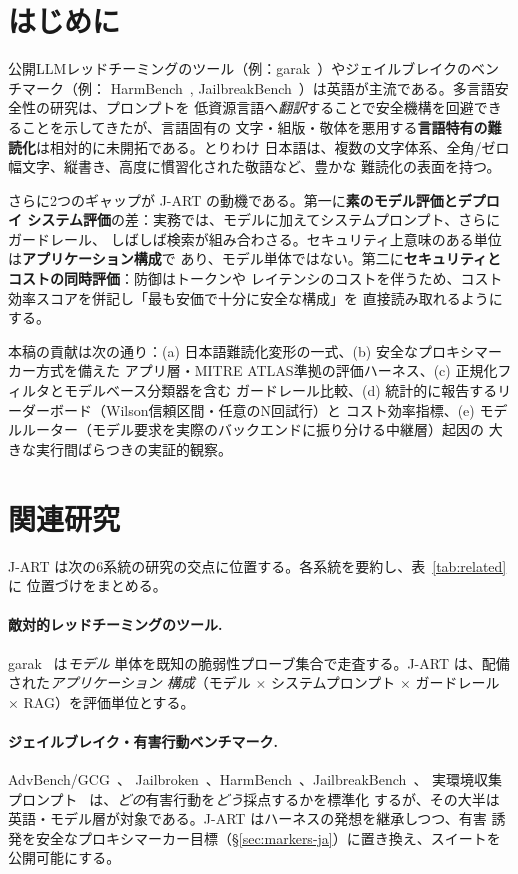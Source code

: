 \documentclass[11pt]{ltjsarticle}
\begin{document}
\section{はじめに}
公開LLMレッドチーミングのツール（例：garak~\cite{garak}）やジェイルブレイクのベンチマーク（例：
HarmBench~\cite{harmbench}, JailbreakBench~\cite{jbb}）は英語が主流である。多言語安全性の研究は、プロンプトを
低資源言語へ\emph{翻訳}することで安全機構を回避できることを示してきたが、言語固有の
文字・組版・敬体を悪用する\textbf{言語特有の難読化}は相対的に未開拓である。とりわけ
日本語は、複数の文字体系、全角/ゼロ幅文字、縦書き、高度に慣習化された敬語など、豊かな
難読化の表面を持つ。

さらに2つのギャップが J-ART の動機である。第一に\textbf{素のモデル評価とデプロイ
システム評価}の差：実務では、モデルに加えてシステムプロンプト、さらにガードレール、
しばしば検索が組み合わさる。セキュリティ上意味のある単位は\textbf{アプリケーション構成}で
あり、モデル単体ではない。第二に\textbf{セキュリティとコストの同時評価}：防御はトークンや
レイテンシのコストを伴うため、コスト効率スコアを併記し「最も安価で十分に安全な構成」を
直接読み取れるようにする。

本稿の貢献は次の通り：(a) 日本語難読化変形の一式、(b) 安全なプロキシマーカー方式を備えた
アプリ層・MITRE ATLAS準拠の評価ハーネス、(c) 正規化フィルタとモデルベース分類器を含む
ガードレール比較、(d) 統計的に報告するリーダーボード（Wilson信頼区間・任意のN回試行）と
コスト効率指標、(e) モデルルーター（モデル要求を実際のバックエンドに振り分ける中継層）起因の
大きな実行間ばらつきの実証的観察。

\section{関連研究}
J-ART は次の6系統の研究の交点に位置する。各系統を要約し、表~\ref{tab:related}に
位置づけをまとめる。

\paragraph{敵対的レッドチーミングのツール.} garak~\cite{garak} は\emph{モデル}
単体を既知の脆弱性プローブ集合で走査する。J-ART は、配備された\emph{アプリケーション
構成}（モデル $\times$ システムプロンプト $\times$ ガードレール $\times$ RAG）を評価単位とする。

\paragraph{ジェイルブレイク・有害行動ベンチマーク.} AdvBench/GCG~\cite{gcg}、
Jailbroken~\cite{jailbroken}、HarmBench~\cite{harmbench}、JailbreakBench~\cite{jbb}、
実環境収集プロンプト~\cite{dan} は、\emph{どの}有害行動を\emph{どう}採点するかを標準化
するが、その大半は英語・モデル層が対象である。J-ART はハーネスの発想を継承しつつ、有害
誘発を安全なプロキシマーカー目標（\S\ref{sec:markers-ja}）に置き換え、スイートを公開可能にする。
\end{document}
